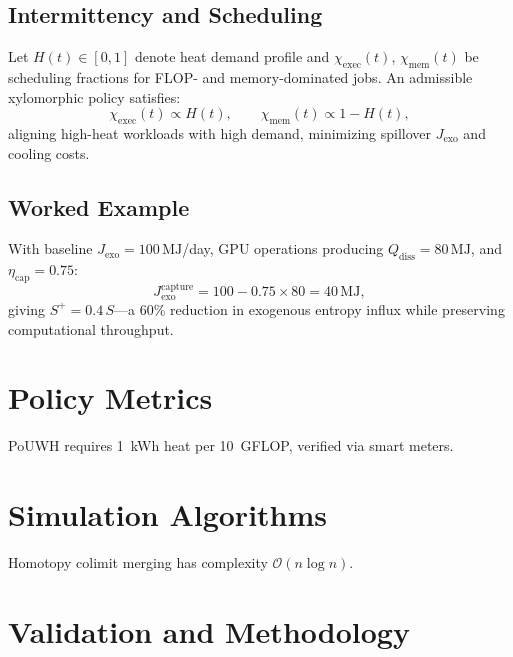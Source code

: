 \documentclass[11pt,a4paper]{article}
\theoremstyle{plain}
\theoremstyle{definition}
\theoremstyle{remark}
\begin{document}
\subsection{Intermittency and Scheduling}

Let $H(t) \in [0,1]$ denote heat demand profile and $\chi_{\mathrm{exec}}(t)$,
$\chi_{\mathrm{mem}}(t)$ be scheduling fractions for FLOP- and
memory-dominated jobs. An admissible xylomorphic policy satisfies:
\[
  \chi_{\mathrm{exec}}(t) \propto H(t), \qquad
  \chi_{\mathrm{mem}}(t) \propto 1 - H(t),
\]
aligning high-heat workloads with high demand, minimizing spillover
$J_{\mathrm{exo}}$ and cooling costs.

\subsection{Worked Example}

With baseline $J_{\mathrm{exo}} = 100\,\mathrm{MJ}$/day, GPU operations
producing $Q_{\mathrm{diss}} = 80\,\mathrm{MJ}$, and
$\eta_{\mathrm{cap}} = 0.75$:
\[
  J^{\mathrm{capture}}_{\mathrm{exo}} = 100 - 0.75 \times 80 = 40\,\mathrm{MJ},
\]
giving $S^+ = 0.4\,S$---a 60\% reduction in exogenous entropy influx while
preserving computational throughput.

\section{Policy Metrics}
\label{app:policy}

PoUWH requires 1~kWh heat per 10~GFLOP, verified via smart meters.

\section{Simulation Algorithms}
\label{app:sim}

Homotopy colimit merging has complexity $\mathcal{O}(n\log n)$.

\section{Validation and Methodology}
\label{app:validation}
\end{document}
